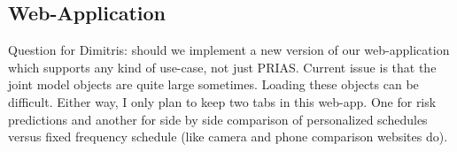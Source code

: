 \subsection{Web-Application}
Question for Dimitris: should we implement a new version of our web-application which supports any kind of use-case, not just PRIAS. Current issue is that the joint model objects are quite large sometimes. Loading these objects can be difficult. Either way, I only plan to keep two tabs in this  web-app. One for risk predictions and another for side by side comparison of personalized schedules versus fixed frequency schedule (like camera and phone comparison websites do).
